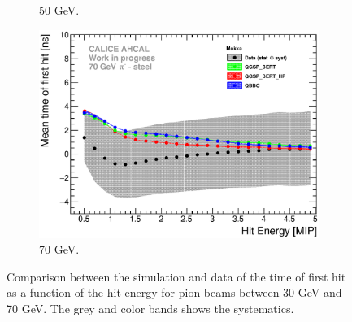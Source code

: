 \begin{figure}[htbp!]
\begin{subfigure}[t]{0.49\textwidth}
    \caption{50 GeV.} \label{fig:Energy_SimData_50GeV}
  \end{subfigure}
  \hfill
  \begin{subfigure}[t]{0.49\textwidth}
    \centering
    \includegraphics[width=1\textwidth]{../Thesis_Plots/Timing/Pions/Plots/ComparisonToSim/Time_Energy_70GeV_Mokka.eps}
    \caption{70 GeV.} \label{fig:Energy_SimData_70GeV}
  \end{subfigure}
  \caption{Comparison between the \mokka simulation and data of the time of first hit as a function of the hit energy for pion beams between 30 GeV and 70 GeV. The grey and color bands shows the systematics.}
\end{figure}

